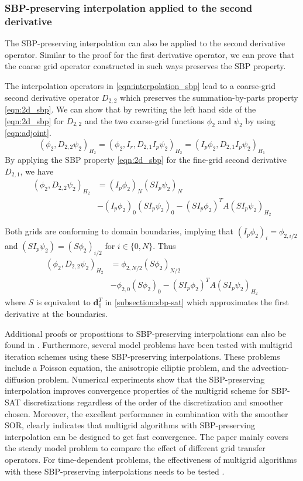 \subsubsection{SBP-preserving interpolation applied to the second derivative}
The SBP-preserving interpolation can also be applied to the second derivative operator. Similar to the proof for the first derivative operator, we can prove that the coarse grid operator constructed in such ways preserves the SBP property.

The interpolation operators in \autoref{eqn:interpolation_sbp} lead to a coarse-grid second derivative operator $D_{2,2}$ which preserves the summation-by-parts property \autoref{eqn:2d_sbp}. We can show that by rewriting the left hand side of the \autoref{eqn:2d_sbp} for $D_{2,2}$ and the two coarse-grid functions $\phi_2$ and $\psi_2$ by using \autoref{eqn:adjoint}.
\begin{equation}
    (\phi_2,D_{2,2}\psi_2)_{H_2} = (\phi_2,I_r,D_{2,1}I_p\psi_2)_{H_2} = (I_p\phi_2,D_{2,1}I_p\psi_2)_{H_1}
\end{equation}
By applying the SBP property \autoref{eqn:2d_sbp} for the fine-grid second derivative $D_{2,1}$, we have
\begin{align}
    (\phi_2,D_{2,2}\psi_2)_{H_2} &= (I_p\phi_2)_N(SI_p\psi_2)_N \nonumber \\ &- (I_p\phi_2)_0(SI_p\psi_2)_0 - (SI_p\phi_2)^TA(SI_p\psi_2)_{H_2}
\end{align}

Both grids are conforming to domain boundaries, implying that $(I_p\phi_2)_i = \phi_{2,i/2}$ and $(SI_p\psi_2) = (S\phi_2)_{i/2}$ for $i\in\{0,N\}$. Thus 
\begin{align}
     (\phi_2,D_{2,2}\psi_2)_{H_2} &= \phi_{2,N/2}(S\phi_2)_{N/2} \nonumber\\ &- \phi_{2,0}(S\phi_2)_0 - (SI_p\phi_2)^TA(SI_p\psi_2)_{H_2}
\end{align}
where $S$ is equivalent to $\boldsymbol{d}_0^T$ in \autoref{subsection:sbp-sat} which approximates the first derivative at the boundaries.

Additional proofs or propositions to SBP-preserving interpolations can also be found in  \cite{ruggiu2018new}. Furthermore, several model problems have been tested with multigrid iteration schemes using these SBP-preserving interpolations. These problems include a Poisson equation, the anisotropic elliptic problem, and the advection-diffusion problem. Numerical experiments show that the SBP-preserving interpolation improves convergence properties of the multigrid scheme for SBP-SAT discretizations regardless of the order of the discretization and smoother chosen. Moreover, the excellent performance in combination with the smoother SOR, clearly indicates that multigrid algorithms with SBP-preserving interpolation can be designed to get fast convergence. The paper mainly covers the steady model problem to compare the effect of different grid transfer operators. For time-dependent problems, the effectiveness of multigrid algorithms with these SBP-preserving interpolations needs to be tested \cite{ruggiu2018new}.


